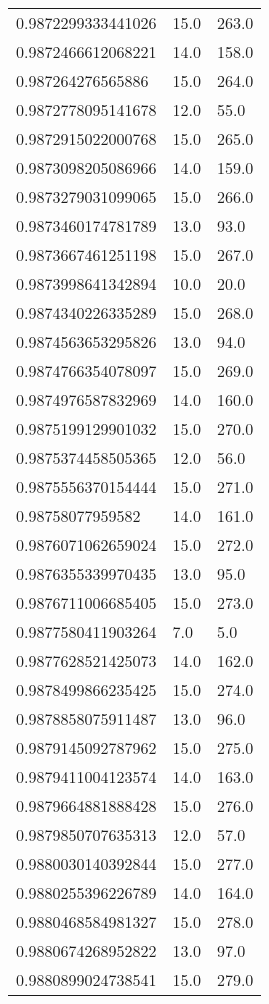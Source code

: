 \begin{center}
\begin{supertabular}[H]{p{0.30\textwidth}p{0.05\textwidth}p{0.05\textwidth}}
0.9872299333441026 & 15.0 & 263.0 \\ 
0.9872466612068221 & 14.0 & 158.0 \\ 
0.987264276565886 & 15.0 & 264.0 \\ 
0.9872778095141678 & 12.0 & 55.0 \\ 
0.9872915022000768 & 15.0 & 265.0 \\ 
0.9873098205086966 & 14.0 & 159.0 \\ 
0.9873279031099065 & 15.0 & 266.0 \\ 
0.9873460174781789 & 13.0 & 93.0 \\ 
0.9873667461251198 & 15.0 & 267.0 \\ 
0.9873998641342894 & 10.0 & 20.0 \\ 
0.9874340226335289 & 15.0 & 268.0 \\ 
0.9874563653295826 & 13.0 & 94.0 \\ 
0.9874766354078097 & 15.0 & 269.0 \\ 
0.9874976587832969 & 14.0 & 160.0 \\ 
0.9875199129901032 & 15.0 & 270.0 \\ 
0.9875374458505365 & 12.0 & 56.0 \\ 
0.9875556370154444 & 15.0 & 271.0 \\ 
0.98758077959582 & 14.0 & 161.0 \\ 
0.9876071062659024 & 15.0 & 272.0 \\ 
0.9876355339970435 & 13.0 & 95.0 \\ 
0.9876711006685405 & 15.0 & 273.0 \\ 
0.9877580411903264 & 7.0 & 5.0 \\ 
0.9877628521425073 & 14.0 & 162.0 \\ 
0.9878499866235425 & 15.0 & 274.0 \\ 
0.9878858075911487 & 13.0 & 96.0 \\ 
0.9879145092787962 & 15.0 & 275.0 \\ 
0.9879411004123574 & 14.0 & 163.0 \\ 
0.9879664881888428 & 15.0 & 276.0 \\ 
0.9879850707635313 & 12.0 & 57.0 \\ 
0.9880030140392844 & 15.0 & 277.0 \\ 
0.9880255396226789 & 14.0 & 164.0 \\ 
0.9880468584981327 & 15.0 & 278.0 \\ 
0.9880674268952822 & 13.0 & 97.0 \\ 
0.9880899024738541 & 15.0 & 279.0 \\ 

\end{supertabular}
\end{center}
